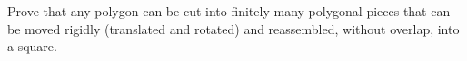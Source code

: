 Prove that any polygon can be cut into finitely many polygonal pieces that can be moved rigidly (translated and rotated) and reassembled, without overlap, into a square.
